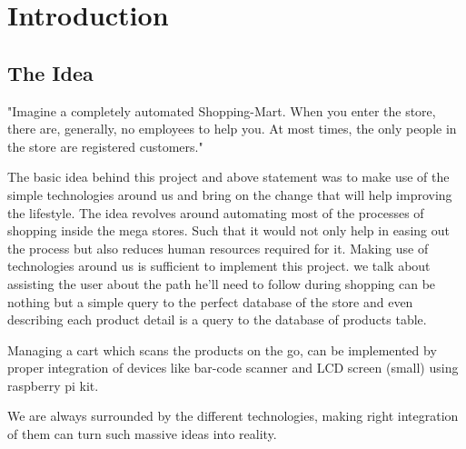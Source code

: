 \documentclass[a4paper,oneside,11pt,english]{report}
\begin{document}
\doublespacing

\tableofcontents
\listoffigures
\clearpage

\chapter{Introduction}
\section{The Idea}
{

	"Imagine a completely automated Shopping-Mart. When you enter the store, there are, generally, no employees to help you. At most times, the only people in the store are registered customers."
	\par The basic idea behind this project and above statement was to make use of the simple technologies around us and bring on the change that will help improving the lifestyle. The idea revolves around automating most of the processes of shopping inside the mega stores. Such that it would not only help in easing out the process but also reduces human resources required for it. Making use of technologies around us is sufficient to implement this project. we talk about assisting the user about the path he'll need to follow during shopping can be nothing but a simple query to the perfect database of the store and even describing each product detail is a query to the database of products table.

	\par Managing a cart which scans the products on the go, can be implemented by proper integration of devices like bar-code scanner and LCD screen (small) using raspberry pi kit.

	\par We are always surrounded by the different technologies, making right integration of them can turn such massive ideas into reality.

}
\end{document}

